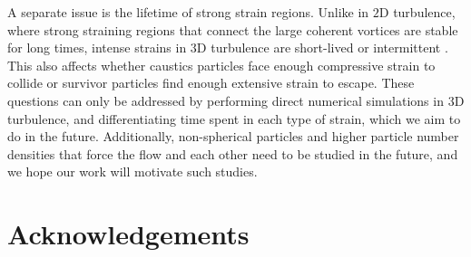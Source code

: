 {A separate issue is the lifetime of strong strain regions. Unlike in $2$D turbulence, where strong straining regions that connect the large coherent vortices are stable for long times, intense strains in $3$D turbulence are short-lived or intermittent \cite{buaria2022}. This also affects whether caustics particles face enough compressive strain to collide or survivor particles find enough extensive strain to escape. These questions can only be addressed by performing direct numerical simulations in $3$D turbulence, and differentiating time spent in each type of strain, which we aim to do in the future.} Additionally, non-spherical particles and higher particle number densities that force the flow and each other need to be studied in the future, and we hope our work will motivate such studies. 
\section{Acknowledgements}
